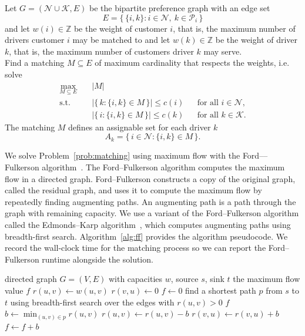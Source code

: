 \begin{problem}
\label{prob:matching}
Let $G = (\mathcal{N} \cup \mathcal{K}, E)$ be the bipartite preference graph with an edge set 
\[
E = \bigl\{\, \{i, k\} : i \in \mathcal{N},\ k \in \mathcal{P}_i \,\bigr\}
\]
and let $w(i) \in \mathbb{Z}$ be the weight of customer $i$, that is, the maximum number of drivers customer $i$ may be matched to and let $w(k) \in \mathbb{Z}$ be the weight of driver $k$, that is, the maximum number of customers driver $k$ may serve.\\
Find a matching $M \subseteq E$ of maximum cardinality that respects the weights, i.e. solve
\begin{align}
  \max_{M \subseteq E} \quad & |M| \label{eq:matching-obj}\\
  \text{s.t.} \quad
  & \bigl|\{\, k : \{i,k\} \in M \,\}\bigr| \le c(i) && \text{for all } i \in \mathcal{N}, \label{eq:matching-cust}\\
  & \bigl|\{\, i : \{i,k\} \in M \,\}\bigr| \le c(k) && \text{for all } k \in \mathcal{K}. \label{eq:matching-drv}
\end{align}
The matching $M$ defines an assignable set for each driver $k$
\[
A_k = \bigl\{\, i \in \mathcal{N} : \{i, k\} \in M \,\bigr\}.
\]
\end{problem}

We solve Problem~\ref{prob:matching} using maximum flow with the Ford––Fulkerson algorithm~\citep{ford1957simple}. The Ford–Fulkerson algorithm computes the maximum flow in a directed graph. Ford–Fulkerson constructs a copy of the original graph, called the residual graph, and uses it to compute the maximum flow by repeatedly finding augmenting paths. An augmenting path is a path through the graph with remaining capacity. We use a variant of the Ford–Fulkerson algorithm called the Edmonds–Karp algorithm~\citep{edmonds1972theoretical}, which computes augmenting paths using breadth-first search. Algorithm~\ref{alg:ff} provides the algorithm pseudocode. We record the wall-clock time for the matching process so we can report the Ford–Fulkerson runtime alongside the solution.

\begin{algorithm}[H]
\caption{Ford–Fulkerson with breadth-first search (Edmonds–Karp)}
\label{alg:ff}
\begin{algorithmic}[1]
\Require directed graph $G = (V, E)$ with capacities $w$, source $s$, sink $t$
\Ensure the maximum flow value $f$
 
  \State $r(u, v) \gets w(u, v)$
  \State $r(v, u) \gets 0$
\EndFor
\State $f \gets 0$
\Loop
  \State find a shortest path $p$ from $s$ to $t$ using breadth-first search over the edges with $r(u, v) > 0$
    \State \Return $f$
  \EndIf
  \State $b \gets \min_{(u, v) \in p} r(u, v)$ 
   
    \State $r(u, v) \gets r(u, v) - b$
    \State $r(v, u) \gets r(v, u) + b$
  \EndFor
  \State $f \gets f + b$
\EndLoop
\end{algorithmic}
\end{algorithm}

